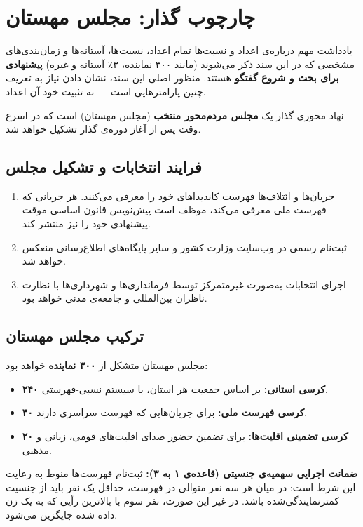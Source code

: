 \chapter{چارچوب گذار: مجلس مهستان}

\begin{modernbox}{یادداشت مهم درباره‌ی اعداد و نسبت‌ها}
تمام اعداد، نسبت‌ها، آستانه‌ها و زمان‌بندی‌های مشخصی که در این سند ذکر می‌شوند (مانند ۳۰۰ نماینده، ۳٪ آستانه و غیره) \textbf{پیشنهادی برای بحث و شروع گفتگو} هستند. منظور اصلی این سند، نشان دادن نیاز به تعریف چنین پارامترهایی است — نه تثبیت خود آن اعداد.
\end{modernbox}

نهاد محوری گذار یک \textbf{مجلس مردم‌محور منتخب} (مجلس مهستان) است که در اسرع وقت پس از آغاز دوره‌ی گذار تشکیل خواهد شد.

\section{فرایند انتخابات و تشکیل مجلس}

\begin{enumerate}
    \item جریان‌ها و ائتلاف‌ها فهرست کاندیداهای خود را معرفی می‌کنند. هر جریانی که فهرست ملی معرفی می‌کند، موظف است پیش‌نویس قانون اساسی موقت پیشنهادی خود را نیز منتشر کند.
    \item ثبت‌نام رسمی در وب‌سایت وزارت کشور و سایر پایگاه‌های اطلاع‌رسانی منعکس خواهد شد.
    \item اجرای انتخابات به‌صورت غیرمتمرکز توسط فرمانداری‌ها و شهرداری‌ها با نظارت ناظران بین‌المللی و جامعه‌ی مدنی خواهد بود.
\end{enumerate}

\section{ترکیب مجلس مهستان}
مجلس مهستان متشکل از \textbf{۳۰۰ نماینده} خواهد بود:
\begin{itemize}
    \item \textbf{۲۴۰ کرسی استانی:} بر اساس جمعیت هر استان، با سیستم نسبی-فهرستی.
    \item \textbf{۴۰ کرسی فهرست ملی:} برای جریان‌هایی که فهرست سراسری دارند.
    \item \textbf{۲۰ کرسی تضمینی اقلیت‌ها:} برای تضمین حضور صدای اقلیت‌های قومی، زبانی و مذهبی.
\end{itemize}

\begin{highlightbox}
\textbf{ضمانت اجرایی سهمیه‌ی جنسیتی (قاعده‌ی ۱ به ۳):}
ثبت‌نام فهرست‌ها منوط به رعایت این شرط است: در میان هر سه نفر متوالی در فهرست، حداقل یک نفر باید از جنسیت کمتر‌نمایندگی‌شده باشد. در غیر این صورت، نفر سوم با بالاترین رأیی که به یک زن داده شده جایگزین می‌شود.
\end{highlightbox}

